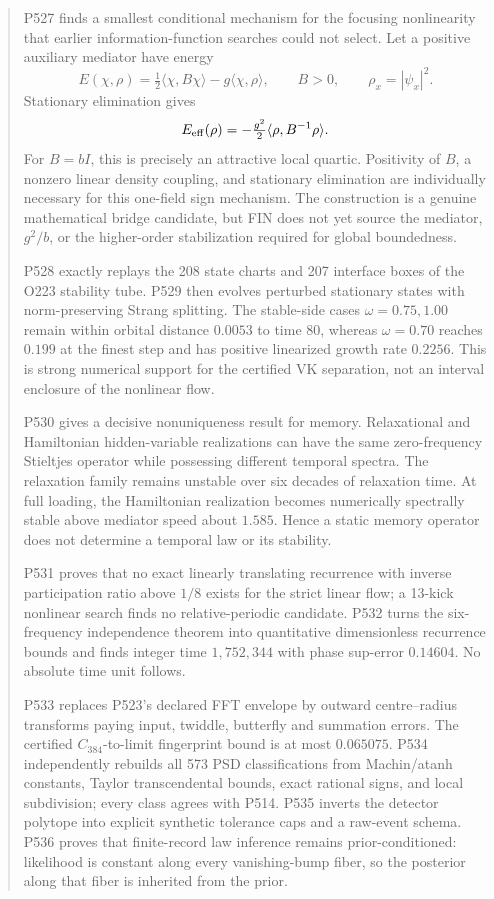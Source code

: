 \documentclass[11pt,a4paper]{article}
\begin{document}
\begin{abstract}
P527 finds a smallest conditional mechanism for the focusing nonlinearity that earlier information-function searches could not select. Let a positive auxiliary mediator have energy
\[
 E(\chi,\rho)=\tfrac12\langle\chi,B\chi\rangle-g\langle\chi,\rho\rangle,
 \qquad B>0,\qquad \rho_x=|\psi_x|^2.
\]
Stationary elimination gives
\[
 E_{\rm eff}(\rho)=-\tfrac{g^2}{2}\langle\rho,B^{-1}\rho\rangle.
\]
For $B=bI$, this is precisely an attractive local quartic. Positivity of $B$, a nonzero linear density coupling, and stationary elimination are individually necessary for this one-field sign mechanism. The construction is a genuine mathematical bridge candidate, but FIN does not yet source the mediator, $g^2/b$, or the higher-order stabilization required for global boundedness.

P528 exactly replays the 208 state charts and 207 interface boxes of the O223 stability tube. P529 then evolves perturbed stationary states with norm-preserving Strang splitting. The stable-side cases $\omega=0.75,1.00$ remain within orbital distance $0.0053$ to time $80$, whereas $\omega=0.70$ reaches $0.199$ at the finest step and has positive linearized growth rate $0.2256$. This is strong numerical support for the certified VK separation, not an interval enclosure of the nonlinear flow.

P530 gives a decisive nonuniqueness result for memory. Relaxational and Hamiltonian hidden-variable realizations can have the same zero-frequency Stieltjes operator while possessing different temporal spectra. The relaxation family remains unstable over six decades of relaxation time. At full loading, the Hamiltonian realization becomes numerically spectrally stable above mediator speed about $1.585$. Hence a static memory operator does not determine a temporal law or its stability.

P531 proves that no exact linearly translating recurrence with inverse participation ratio above $1/8$ exists for the strict linear flow; a 13-kick nonlinear search finds no relative-periodic candidate. P532 turns the six-frequency independence theorem into quantitative dimensionless recurrence bounds and finds integer time $1{,}752{,}344$ with phase sup-error $0.14604$. No absolute time unit follows.

P533 replaces P523's declared FFT envelope by outward centre--radius transforms paying input, twiddle, butterfly and summation errors. The certified $C_{384}$-to-limit fingerprint bound is at most $0.065075$. P534 independently rebuilds all 573 PSD classifications from Machin/atanh constants, Taylor transcendental bounds, exact rational signs, and local subdivision; every class agrees with P514. P535 inverts the detector polytope into explicit synthetic tolerance caps and a raw-event schema. P536 proves that finite-record law inference remains prior-conditioned: likelihood is constant along every vanishing-bump fiber, so the posterior along that fiber is inherited from the prior.


\end{abstract}
\end{document}
